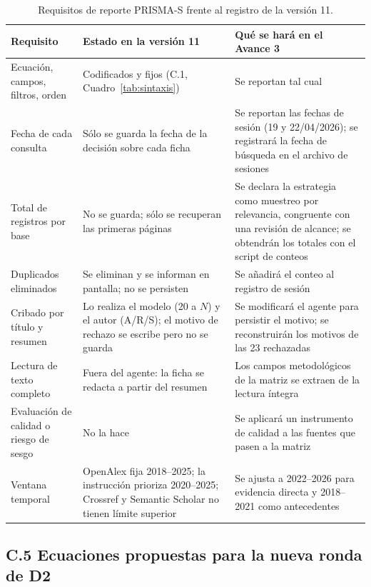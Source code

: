 \documentclass[letter,12pt]{article}
\begin{document}
\begin{table}[H]
\centering
\footnotesize
\caption{Requisitos de reporte PRISMA-S frente al registro de la versión 11.}
\label{tab:limites-registro}
\renewcommand{\arraystretch}{1.3}
\begin{tabular}{|p{3.2cm}|p{4.6cm}|p{4.6cm}|}
\hline
\rowcolor{bgCotejo}
\textbf{Requisito} & \textbf{Estado en la versión 11} & \textbf{Qué se hará en el Avance 3} \\
\hline
Ecuación, campos, filtros, orden & Codificados y fijos (C.1, Cuadro~\ref{tab:sintaxis}) & Se reportan tal cual \\
\hline
Fecha de cada consulta & Sólo se guarda la fecha de la decisión sobre cada ficha & Se reportan las fechas de sesión (19 y 22/04/2026); se registrará la fecha de búsqueda en el archivo de sesiones \\
\hline
Total de registros por base & No se guarda; sólo se recuperan las primeras páginas & Se declara la estrategia como muestreo por relevancia, congruente con una revisión de alcance; se obtendrán los totales con el script de conteos \\
\hline
Duplicados eliminados & Se eliminan y se informan en pantalla; no se persisten & Se añadirá el conteo al registro de sesión \\
\hline
Cribado por título y resumen & Lo realiza el modelo (20 a $N$) y el autor (A/R/S); el motivo de rechazo se escribe pero no se guarda & Se modificará el agente para persistir el motivo; se reconstruirán los motivos de las 23 rechazadas \\
\hline
Lectura de texto completo & Fuera del agente: la ficha se redacta a partir del resumen & Los campos metodológicos de la matriz se extraen de la lectura íntegra \\
\hline
Evaluación de calidad o riesgo de sesgo & No la hace & Se aplicará un instrumento de calidad a las fuentes que pasen a la matriz \\
\hline
Ventana temporal & OpenAlex fija 2018--2025; la instrucción prioriza 2020--2025; Crossref y Semantic Scholar no tienen límite superior & Se ajusta a 2022--2026 para evidencia directa y 2018--2021 como antecedentes \\
\hline
\end{tabular}
\end{table}

\subsection*{C.5 Ecuaciones propuestas para la nueva ronda de D2}
\end{document}
